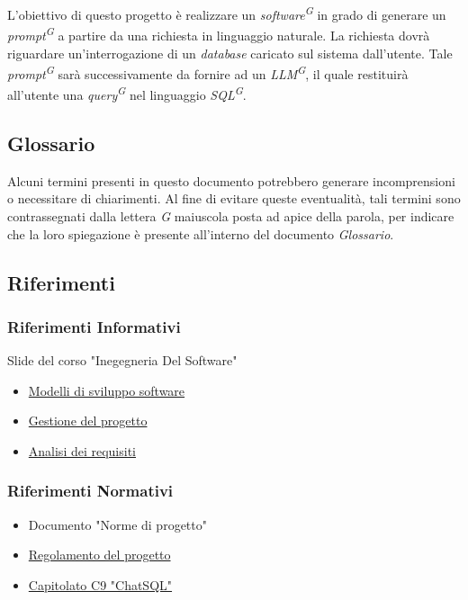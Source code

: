 \documentclass[5pt]{article}
\begin{document}
L'obiettivo di questo progetto è realizzare un \textit{software\textsuperscript{G}} in grado di generare 
un \textit{prompt\textsuperscript{G}} a partire da una richiesta in linguaggio naturale. La richiesta dovrà riguardare un'interrogazione 
di un \textit{database} caricato sul sistema dall'utente. Tale \textit{prompt\textsuperscript{G}} sarà successivamente da fornire 
ad un \textit{LLM\textsuperscript{G}}, il quale restituirà all'utente una \textit{query\textsuperscript{G}} nel linguaggio 
\textit{SQL\textsuperscript{G}}.

\subsection{Glossario}
Alcuni termini presenti in questo documento potrebbero generare incomprensioni o necessitare di chiarimenti. 
Al fine di evitare queste eventualità, tali termini sono contrassegnati dalla lettera \textit{G} maiuscola posta ad apice della parola, 
per indicare che la loro spiegazione è presente all'interno del documento \textit{Glossario}.

\subsection{Riferimenti}
\subsubsection{Riferimenti Informativi}
Slide del corso "Inegegneria Del Software"
\begin{itemize}
      \item \href{https://www.math.unipd.it/~tullio/IS-1/2023/Dispense/T3.pdf}{Modelli di sviluppo software}
      \item \href{https://www.math.unipd.it/~tullio/IS-1/2023/Dispense/T4.pdf}{Gestione del progetto}
      \item \href{https://www.math.unipd.it/~tullio/IS-1/2023/Dispense/T5.pdf}{Analisi dei requisiti} 
\end{itemize}
\subsubsection{Riferimenti Normativi}
\begin{itemize}
      \item Documento "Norme di progetto"
      \item \href{https://www.math.unipd.it/~tullio/IS-1/2023/Dispense/PD2.pdf}{Regolamento del progetto}
      \item \href{https://www.math.unipd.it/~tullio/IS-1/2023/Progetto/C9.pdf}{Capitolato C9 "ChatSQL"} 
\end{itemize}
\end{document}

